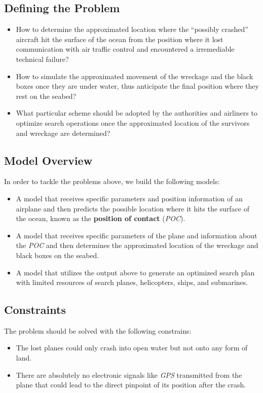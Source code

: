 \documentclass[a4paper,11pt]{article}
\begin{document}
\begin{spacing}{1.0}
\subsection{Defining the Problem}\label{Def the Problem}
\begin{itemize}
	\item How to determine the approximated  location where the ``possibly crashed'' aircraft hit the surface of the ocean from the position where it lost communication with air traffic control and encountered a irremediable technical failure?
	\item How to simulate the approximated movement of the wreckage and the black boxes once they are under water, thus anticipate the final position where they rest on the seabed? 
	\item What particular scheme should be adopted by the authorities and airliners to optimize search operations once the approximated location of the survivors and wreckage are determined?
\end{itemize}


\subsection{Model Overview}\label{Model Overview}
In order to tackle the problems above, we build the following models:
\begin{itemize}
	\item A model that receives  specific parameters and position information of an airplane and then predicts the possible location where it hits the surface of the ocean, known as the \textbf{position of contact} (\textit{POC}).
	\item A model that receives  specific parameters of the plane and information about the \textit{POC} and then determines the approximated location of the wreckage and black boxes on the seabed.
	\item A model that utilizes the output above to generate an optimized search plan with limited resources of search planes, helicopters, ships, and submarines. 
\end{itemize}


\subsection{Constraints}\label{Constraints}
The problem should be solved with the following constrains:
\begin{itemize}
	\item The lost planes could only crash into open water but not onto any form of land.
	\item There are absolutely no electronic signals like \textit{GPS} transmitted from the plane that could lead to the direct pinpoint of its position after the crash.


\end{itemize}
\end{spacing}
\end{document}
